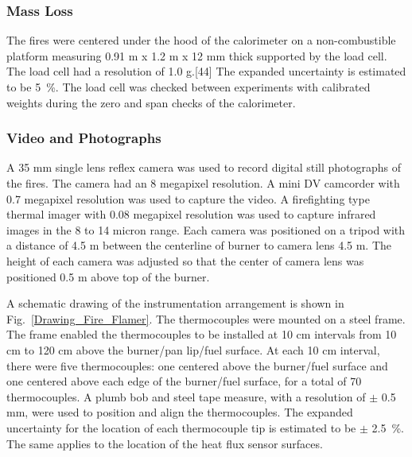 \documentclass[twoside]{uocthesis}
\begin{document}
\subsubsection{Mass Loss}

The fires were centered under the hood of the calorimeter on a non-combustible platform measuring 0.91 m x 1.2 m x 12 mm thick supported by the load cell.  The load cell had a resolution of 1.0 g.[44] The expanded uncertainty is estimated to be 5~\%.  The load cell was checked between experiments with calibrated weights during the zero and span checks of the calorimeter.

\subsubsection{Video and Photographs}

A 35 mm single lens reflex camera was used to record digital still photographs of the fires.  The camera had an 8 megapixel resolution.  A mini DV camcorder with 0.7 megapixel resolution was used to capture the video.  A firefighting type thermal imager with 0.08 megapixel resolution was used to capture infrared images in the 8 to 14 micron range.  Each camera was positioned on a tripod with a distance of 4.5 m between the centerline of burner to camera lens 4.5 m.  The height of each camera was adjusted so that the center of camera lens was positioned 0.5 m above top of the burner. 
  
A schematic drawing of the instrumentation arrangement is shown in Fig.~\ref{Drawing_Fire_Flamer}.  The thermocouples were mounted on a steel frame.  The frame enabled the thermocouples to be installed at 10 cm intervals from 10 cm to 120 cm above the burner/pan lip/fuel surface. At each 10 cm interval, there were five thermocouples: one centered above the burner/fuel surface and one centered above each edge of the burner/fuel surface, for a total of 70 thermocouples.  A plumb bob and steel tape measure, with a resolution of $\pm$ 0.5 mm, were used to position and align the thermocouples.   The expanded uncertainty for the location of each thermocouple tip is estimated to be $\pm$ 2.5~\%.  The same applies to the location of the heat flux sensor surfaces.
\end{document}
